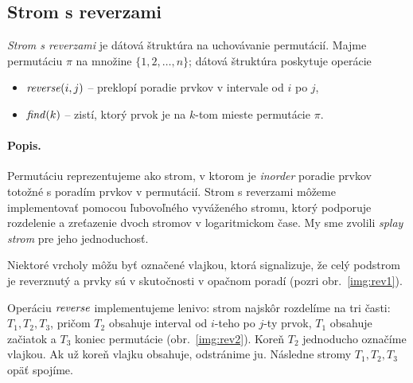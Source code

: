 
\subsection{Strom s reverzami}
\emph{Strom s reverzami} je dátová štruktúra na uchovávanie permutácií. 
Majme permutáciu $\pi$ na množine $\{1,2,\ldots,n\}$; dátová štruktúra
poskytuje operácie 
\begin{itemize}
\item $\mathop{\mathit{reverse}}(i,j)$ -- preklopí poradie prvkov v intervale od $i$ po $j$,
\item $\mathop{\mathit{find}}(k)$ -- zistí, ktorý prvok je na $k$-tom mieste permutácie $\pi$.
\end{itemize}

\paragraph{Popis.}
Permutáciu reprezentujeme ako strom, v ktorom je \emph{inorder} poradie prvkov totožné 
s poradím prvkov v permutácií. Strom s reverzami môžeme implementovať pomocou ľubovoľného 
vyváženého stromu, ktorý podporuje rozdelenie a zreťazenie dvoch stromov v logaritmickom čase. 
My sme zvolili \emph{splay strom} pre jeho jednoduchosť. 


Niektoré vrcholy môžu byť označené vlajkou, ktorá signalizuje, že celý podstrom je reverznutý a 
prvky sú v skutočnosti v opačnom poradí (pozri obr.~\ref{img:rev1}).

Operáciu $\mathop{\mathit{reverse}}$ implementujeme lenivo: 
strom najskôr rozdelíme na tri časti: $T_1,T_2,T_3$, pričom $T_2$ obsahuje interval od $i$-teho 
po $j$-ty prvok, $T_1$ obsahuje začiatok a $T_3$ koniec permutácie (obr.~\ref{img:rev2}). 
Koreň $T_2$ jednoducho označíme vlajkou. Ak už koreň vlajku obsahuje, odstránime ju. 
Následne stromy $T_1,T_2,T_3$ opäť spojíme.

